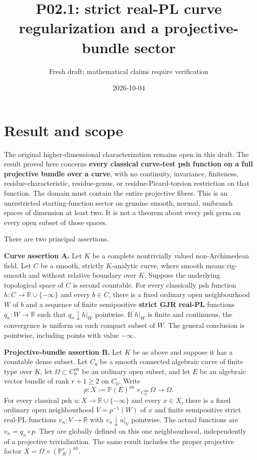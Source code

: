 \documentclass[
  11pt,
]{article}
\title{P02.1: strict real-PL curve regularization and a
projective-bundle sector}
\author{Fresh draft; mathematical claims require verification}
\date{2026-10-04}
\begin{document}
\maketitle

\section{Result and scope}\label{result-and-scope}

The original higher-dimensional characterization remains open in this
draft. The result proved here concerns \textbf{every classical
curve-test psh function on a full projective bundle over a curve}, with
no continuity, invariance, finiteness, residue-characteristic,
residue-genus, or residue-Picard-torsion restriction on that function.
The domain must contain the entire projective fibres. This is an
unrestricted starting-function sector on genuine smooth, normal,
unibranch spaces of dimension at least two. It is not a theorem about
every psh germ on every open subset of those spaces.

There are two principal assertions.

\textbf{Curve assertion A.} Let \(K\) be a complete nontrivially valued
non-Archimedean field. Let \(C\) be a smooth, strictly \(K\)-analytic
curve, where smooth means rig-smooth and without relative boundary over
\(K\). Suppose the underlying topological space of \(C\) is second
countable. For every classically psh function
\(h:C\to\mathbb R\cup\{-\infty\}\) and every \(b\in C\), there is a
fixed ordinary open neighbourhood \(W\) of \(b\) and a sequence of
finite semipositive \textbf{strict GJR real-PL} functions
\(q_n:W\to\mathbb R\) such that \(q_n\downarrow h|_W\) pointwise. If
\(h|_W\) is finite and continuous, the convergence is uniform on each
compact subset of \(W\). The general conclusion is pointwise, including
points with value \(-\infty\).

\textbf{Projective-bundle assertion B.} Let \(K\) be as above and
suppose it has a countable dense subset. Let \(C_0\) be a smooth
connected algebraic curve of finite type over \(K\), let
\(\Omega\subset C_0^{\mathrm{an}}\) be an ordinary open subset, and let
\(E\) be an algebraic vector bundle of rank \(r+1\geq2\) on \(C_0\).
Write
\[p:X:=\mathbb P(E)^{\mathrm{an}}\times_{C_0^{\mathrm{an}}}\Omega\longrightarrow\Omega.\]
For every classical psh \(u:X\to\mathbb R\cup\{-\infty\}\) and every
\(x\in X\), there is a fixed ordinary open neighbourhood \(V=p^{-1}(W)\)
of \(x\) and finite semipositive strict real-PL functions
\(v_n:V\to\mathbb R\) with \(v_n\downarrow u|_V\) pointwise. The actual
functions are \(v_n=q_n\circ p\). They are globally defined on this one
neighbourhood, independently of a projective trivialization. The same
result includes the proper projective factor
\(X=\Omega\times(\mathbb P_K^r)^{\mathrm{an}}\).
\end{document}
